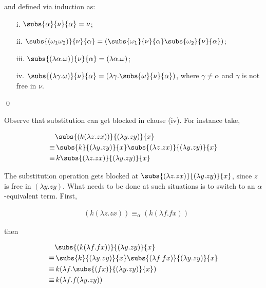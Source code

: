 \documentclass[11pt]{article}
\begin{document}
and defined via induction as:

\begin{udefinition}[Substitution]

\begin{itemize}
\item[]
\item[i.] $\subs{\alpha}{\nu}{\alpha}= \nu$;
\item[ii.] $\subs{(\omega_1\omega_2)}{\nu}{\alpha}= (\subs{\omega_1}{\nu}{\alpha}\subs{\omega_2}{\nu}{\alpha})$;
\item[iii.] $\subs{(\lambda \alpha.\omega)}{\nu}{\alpha}= (\lambda \alpha.\omega)$;
\item[iv.] $\subs{(\lambda \gamma.\omega)}{\nu}{\alpha} = (\lambda \gamma.\subs{\omega}{\nu}{\alpha})$, where $\gamma\neq\alpha$ and $\gamma$ is not free in $\nu$.

\end{itemize}

\qed
\end{udefinition}

Observe that substitution can get blocked in clause (iv). For instance take,

\begin{align}
& \subs{(k(\lambda z.zx))}{(\lambda y.zy)}{x}\\
 \equiv & \, \subs{k}{(\lambda y.zy)}{x}\subs{(\lambda z.zx)}{(\lambda y.zy)}{x}  \nonumber\\
 \equiv & \, k \subs{(\lambda z.zx)}{(\lambda y.zy)}{x} \nonumber
\end{align}

The substitution operation gets blocked at $\subs{(\lambda z.zx)}{(\lambda y.zy)}{x}$, since $z$ is free in $(\lambda y.zy)$. What needs to be done at such situations is to switch to an $\alpha$-equivalent term. First, 

\begin{align}
& (k(\lambda z.zx)) \equiv_\alpha (k(\lambda f.fx)) 
\end{align}

then

\begin{align}
& \subs{(k(\lambda f.fx))}{(\lambda y.zy)}{x}\\
 \equiv & \, \subs{k}{(\lambda y.zy)}{x}\subs{(\lambda f.fx)}{(\lambda y.zy)}{x}  \nonumber\\
 \equiv & \, k (\lambda f.\subs{(fx)}{(\lambda y.zy)}{x}) \nonumber\\
 \equiv & \, k (\lambda f.f(\lambda y.zy))\nonumber
\end{align}
\end{document}
